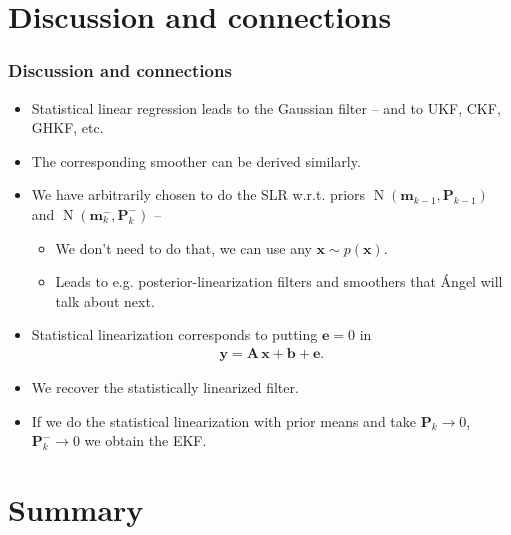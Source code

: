 \documentclass[first=dgreen,second=purple,presentation]{elecslides}
\newcommand{\mbf}[1]{\mathbf{#1}}
\DeclareMathOperator{\N}{N}
\newcommand{\vb}{\mbf{b}}
\newcommand{\ve}{\mbf{e}}
\newcommand{\vm}{\mbf{m}}
\newcommand{\vx}{\mbf{x}}
\newcommand{\vy}{\mbf{y}}
\newcommand{\MA}{\mbf{A}}
\newcommand{\MP}{\mbf{P}}
\begin{document}
\section{Discussion and connections}

\begin{frame}
\frametitle{Discussion and connections}

\begin{itemize}[<+->]
\item Statistical linear regression leads to the \alert{Gaussian filter} -- and to UKF, CKF, GHKF, etc.

\item The corresponding \alert{smoother} can be derived similarly.

\item We have \alert{arbitrarily chosen} to do the SLR \alert{w.r.t. priors} $\N(\vm_{k-1},\MP_{k-1})$ and $\N(\vm_k^-,\MP_k^-)$ -- 

\begin{itemize}[<+->]
\item We don't need to do that, we can use any $\vx \sim p(\vx)$.
\item Leads to e.g. posterior-linearization filters and smoothers that \'Angel will talk about next.
\end{itemize}

\item \alert{Statistical linearization} corresponds to putting $\ve = 0$ in 
%
\begin{equation}
\begin{split}
  \vy = \MA \, \vx + \vb + \ve.
\end{split}
\nonumber
\end{equation}

\item We recover the \alert{statistically linearized filter}.

\item If we do the statistical linearization with \alert{prior means} and take $\MP_k \to 0$, $\MP_k^-
\to 0$ we obtain the \alert{EKF}.

\end{itemize}
\end{frame}



\section{Summary}
\end{document}
